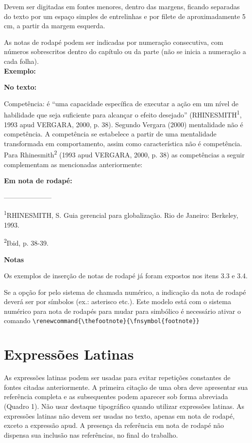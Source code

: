 Devem ser digitadas em fontes menores, dentro das margens, ficando separadas do texto por um espaço simples de entrelinhas e por filete de aproximadamente 5 cm, a partir da margem esquerda.

As notas de rodapé podem ser indicadas por numeração consecutiva, com números sobrescritos dentro do capítulo ou da parte (não se inicia a numeração a cada folha).\\

\textbf{Exemplo:}

\begin{alineas}

\item

\textbf{No texto:}

Competência: é “uma capacidade específica de executar a ação em um nível de habilidade que seja suficiente para alcançar o efeito desejado” (RHINESMITH\textsuperscript{1}, 1993 apud VERGARA, 2000, p. 38).
Segundo Vergara (2000) mentalidade não é competência. A competência se estabelece a partir de uma mentalidade transformada em comportamento, assim como característica não é competência.
Para Rhinesmith\textsuperscript{2} (1993 apud VERGARA, 2000, p. 38) as competências a seguir complementam as mencionadas anteriormente:

\textbf{Em nota de rodapé:}

---------------------

\textsuperscript{1}RHINESMITH, S. Guia gerencial para globalização. Rio de Janeiro: Berkeley, 1993.

\textsuperscript{2}Ibid, p. 38-39.


\end{alineas}

\textbf{Notas}

Os exemplos de inserção de notas de rodapé já foram expostos nos itens 3.3 e 3.4.

Se a opção for pelo sistema de chamada numérico, a indicação da nota de rodapé deverá ser por símbolos (ex.: asterisco etc.). 
Este modelo está com o sistema numérico para nota de rodapés para mudar para simbólico é necessário ativar o comando \verb+\renewcommand{\thefootnote}{\fnsymbol{footnote}}+

\section{Expressões Latinas}

As expressões latinas podem ser usadas para evitar repetições
constantes de fontes citadas anteriormente. A primeira citação de uma obra
deve apresentar sua referência completa e as subsequentes podem aparecer
sob forma abreviada (Quadro 1).
Não usar destaque tipográfico quando utilizar expressões latinas.
As expressões latinas não devem ser usadas no texto, apenas em nota
de rodapé, exceto a expressão apud.
A presença da referência em nota de rodapé não dispensa sua inclusão
nas referências, no final do trabalho.

